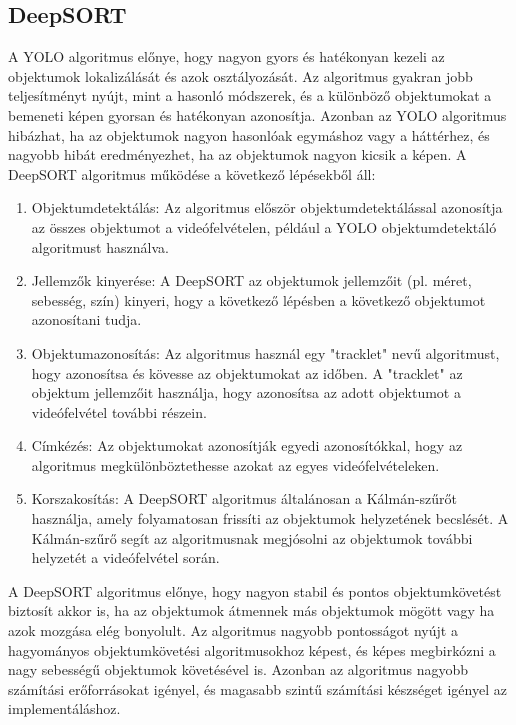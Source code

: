 \documentclass[acmtog, authorversion]{acmart}
\begin{document}
\subsection{DeepSORT}
A YOLO algoritmus előnye, hogy nagyon gyors és hatékonyan kezeli az objektumok lokalizálását és azok osztályozását. Az algoritmus gyakran jobb teljesítményt nyújt, mint a hasonló módszerek, és a különböző objektumokat a bemeneti képen gyorsan és hatékonyan azonosítja. Azonban az YOLO algoritmus hibázhat, ha az objektumok nagyon hasonlóak egymáshoz vagy a háttérhez, és nagyobb hibát eredményezhet, ha az objektumok nagyon kicsik a képen.
A DeepSORT algoritmus működése a következő lépésekből áll:
\begin{enumerate}
    \item Objektumdetektálás: Az algoritmus először objektumdetektálással azonosítja az összes objektumot a videófelvételen, például a YOLO objektumdetektáló algoritmust használva.
    \item Jellemzők kinyerése: A DeepSORT az objektumok jellemzőit (pl. méret, sebesség, szín) kinyeri, hogy a következő lépésben a következő objektumot azonosítani tudja.
    \item Objektumazonosítás: Az algoritmus használ egy "tracklet" nevű algoritmust, hogy azonosítsa és kövesse az objektumokat az időben. A "tracklet" az objektum jellemzőit használja, hogy azonosítsa az adott objektumot a videófelvétel további részein.
    \item Címkézés: Az objektumokat azonosítják egyedi azonosítókkal, hogy az algoritmus megkülönböztethesse azokat az egyes videófelvételeken.
    \item Korszakosítás: A DeepSORT algoritmus általánosan a Kálmán-szűrőt használja, amely folyamatosan frissíti az objektumok helyzetének becslését. A Kálmán-szűrő segít az algoritmusnak megjósolni az objektumok további helyzetét a videófelvétel során.
\end{enumerate}
A DeepSORT algoritmus előnye, hogy nagyon stabil és pontos objektumkövetést biztosít akkor is, ha az objektumok átmennek más objektumok mögött vagy ha azok mozgása elég bonyolult. Az algoritmus nagyobb pontosságot nyújt a hagyományos objektumkövetési algoritmusokhoz képest, és képes megbirkózni a nagy sebességű objektumok követésével is. Azonban az algoritmus nagyobb számítási erőforrásokat igényel, és magasabb szintű számítási készséget igényel az implementáláshoz.
\end{document}
